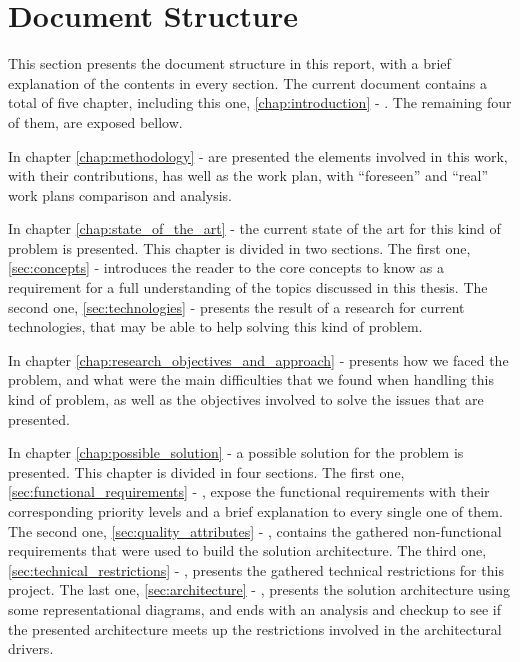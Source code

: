 \section{Document Structure}
\label{sec:document_structure}

This section presents the document structure in this report, with a brief explanation of the contents in every section. The current document contains a total of five chapter, including this one, \ref{chap:introduction} - . The remaining four of them, are exposed bellow.

In chapter \ref{chap:methodology} -  are presented the elements involved in this work, with their contributions, has well as the work plan, with ``foreseen'' and ``real'' work plans comparison and analysis.

In chapter \ref{chap:state_of_the_art} -  the current state of the art for this kind of problem is presented. This chapter is divided in two sections. The first one, \ref{sec:concepts} -  introduces the reader to the core concepts to know as a requirement for a full understanding of the topics discussed in this thesis. The second one, \ref{sec:technologies} -  presents the result of a research for current technologies, that may be able to help solving this kind of problem.

In chapter \ref{chap:research_objectives_and_approach} -  presents how we faced the problem, and what were the main difficulties that we found when handling this kind of problem, as well as the objectives involved to solve the issues that are presented.

In chapter \ref{chap:possible_solution} -  a possible solution for the problem is presented. This chapter is divided in four sections. The first one, \ref{sec:functional_requirements} - , expose the functional requirements with their corresponding priority levels and a brief explanation to every single one of them. The second one, \ref{sec:quality_attributes} - , contains the gathered non-functional requirements that were used to build the solution architecture. The third one, \ref{sec:technical_restrictions} - , presents the gathered technical restrictions for this project. The last one, \ref{sec:architecture} - , presents the solution architecture using some representational diagrams, and ends with an analysis and checkup to see if the presented architecture meets up the restrictions involved in the architectural drivers.


